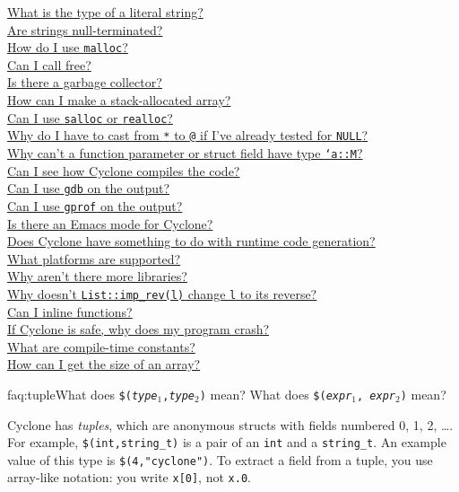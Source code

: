 \begin{small}
\hyperlink{faq:litstring}{What is the type of a literal string?}\\
\hyperlink{faq:nullterminate}{Are strings null-terminated?}\\
\hyperlink{faq:malloc}{How do I use \texttt{malloc}?}\\
\hyperlink{faq:free}{Can I call free?}\\
\hyperlink{faq:gc}{Is there a garbage collector?}\\
\hyperlink{faq:stackalloc}{How can I make a stack-allocated array?}\\
\hyperlink{faq:realloc}{Can I use \texttt{salloc} or \texttt{realloc}?}\\
\hyperlink{faq:nullcast}{Why do I have to cast from \texttt{*} to \texttt{@} if I've already tested for \texttt{NULL}?}\\
\hyperlink{faq:memkind}{Why can't a function parameter or struct field have type \texttt{`a::M}?}\\
\hyperlink{faq:compile}{Can I see how Cyclone compiles the code?}\\
\hyperlink{faq:gdb}{Can I use \texttt{gdb} on the output?}\\
\hyperlink{faq:gprof}{Can I use \texttt{gprof} on the output?}\\
\hyperlink{faq:emacs}{Is there an Emacs mode for Cyclone?}\\
\hyperlink{faq:rtcg}{Does Cyclone have something to do with runtime code generation?}\\
\hyperlink{faq:platforms}{What platforms are supported?}\\
\hyperlink{faq:libs}{Why aren't there more libraries?}\\
\hyperlink{faq:imprev}{Why doesn't \texttt{List::imp_rev(l)} change \texttt{l} to its reverse?}\\
\hyperlink{faq:inline}{Can I inline functions?}\\
\hyperlink{faq:crash}{If Cyclone is safe, why does my program crash?}\\
\hyperlink{faq:ctc}{What are compile-time constants?}\\
\hyperlink{faq:arraysize}{How can I get the size of an array?}
\end{small}
\fi

\begin{faqa}{faq:tuple}{What does \texttt{\$({\it type}$_1$,{\it type}$_2$)} mean?  What does \texttt{\$({\it expr}$_1$, {\it expr}$_2$)} mean?}

Cyclone has \emph{tuples}, which are anonymous structs with fields
numbered 0, 1, 2, \ldots.  For example, \texttt{\$(int,string_t)} is a
pair of an \texttt{int} and a \texttt{string_t}.  An example value of
this type is \texttt{\$(4,"cyclone")}.  To extract a field from a
tuple, you use array-like notation: you write \texttt{x[0]}, not
\texttt{x.0}.
\end{faqa}

